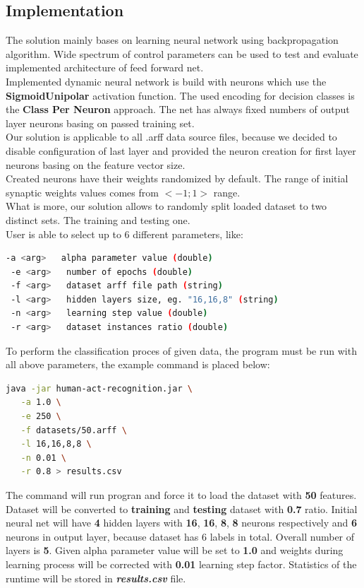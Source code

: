 \documentclass[12pt,a4paper]{article}
\begin{document}
\subsection{Implementation}
The solution mainly bases on learning neural network using backpropagation algorithm. Wide spectrum of control parameters can be used to test and evaluate implemented architecture of feed forward net.\\
Implemented dynamic neural network is build with neurons which use the \textbf{SigmoidUnipolar} activation function. The used encoding for decision classes is the \textbf{Class Per Neuron} approach. The net has always fixed numbers of output layer neurons basing on passed training set.\\
Our solution is applicable to all .arff data source files, because we decided to disable configuration of last layer and provided the neuron creation for first layer neurons basing on the feature vector size.\\
Created neurons have their weights randomized by default. The range of initial synaptic weights values comes from $<-1;1>$ range.\\
What is more, our solution allows to randomly split loaded dataset to two distinct sets. The training and testing one. \\
User is able to select up to 6 different parameters, like:
\begin{lstlisting}[language=bash]
 -a <arg>   alpha parameter value (double)
 -e <arg>   number of epochs (double)
 -f <arg>   dataset arff file path (string)
 -l <arg>   hidden layers size, eg. "16,16,8" (string)
 -n <arg>   learning step value (double)
 -r <arg>   dataset instances ratio (double)
\end{lstlisting}

To perform the classification proces of given data, the program must be run with all above parameters, the example command is placed below:
\begin{lstlisting}[language=bash]
java -jar human-act-recognition.jar \
   -a 1.0 \
   -e 250 \
   -f datasets/50.arff \
   -l 16,16,8,8 \
   -n 0.01 \
   -r 0.8 > results.csv
\end{lstlisting}

The command will run progran and force it to load the dataset with \textbf{50} features. Dataset will be converted to \textbf{training} and \textbf{testing} dataset with \textbf{0.7} ratio. Initial neural net will have \textbf{4} hidden layers with \textbf{16}, \textbf{16}, \textbf{8}, \textbf{8} neurons respectively and \textbf{6} neurons in output layer, because dataset has 6 labels in total. Overall number of layers is \textbf{5}. Given alpha parameter value will be set to \textbf{1.0} and weights during learning process will be corrected with \textbf{0.01} learning step factor. Statistics of the runtime will be stored in \textit{\textbf{results.csv}} file.
\end{document}

